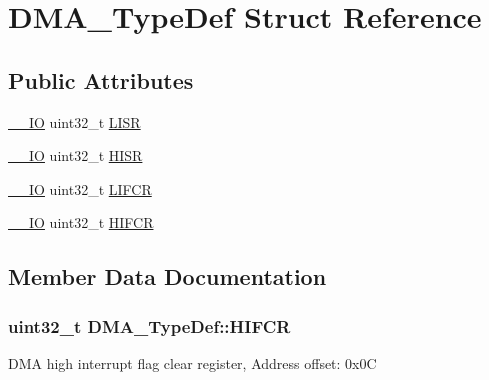 \hypertarget{struct_d_m_a___type_def}{}\section{D\+M\+A\+\_\+\+Type\+Def Struct Reference}
\label{struct_d_m_a___type_def}
\subsection*{Public Attributes}
\begin{DoxyCompactItemize}
\item 
\hyperlink{core__cm4_8h_aec43007d9998a0a0e01faede4133d6be}{\+\_\+\+\_\+\+IO} uint32\+\_\+t \hyperlink{struct_d_m_a___type_def_aacb4a0977d281bc809cb5974e178bc2b}{L\+I\+SR}
\item 
\hyperlink{core__cm4_8h_aec43007d9998a0a0e01faede4133d6be}{\+\_\+\+\_\+\+IO} uint32\+\_\+t \hyperlink{struct_d_m_a___type_def_a01a90a5fcd6459e10b81c0ab737dd2e3}{H\+I\+SR}
\item 
\hyperlink{core__cm4_8h_aec43007d9998a0a0e01faede4133d6be}{\+\_\+\+\_\+\+IO} uint32\+\_\+t \hyperlink{struct_d_m_a___type_def_a11adb689c874d38b49fa44990323b653}{L\+I\+F\+CR}
\item 
\hyperlink{core__cm4_8h_aec43007d9998a0a0e01faede4133d6be}{\+\_\+\+\_\+\+IO} uint32\+\_\+t \hyperlink{struct_d_m_a___type_def_a1e4f50b935bab2520788ae936f2e55c1}{H\+I\+F\+CR}
\end{DoxyCompactItemize}


\subsection{Member Data Documentation}
\subsubsection[{\texorpdfstring{H\+I\+F\+CR}{HIFCR}}]{ uint32\+\_\+t D\+M\+A\+\_\+\+Type\+Def\+::\+H\+I\+F\+CR}\hypertarget{struct_d_m_a___type_def_a1e4f50b935bab2520788ae936f2e55c1}{}\label{struct_d_m_a___type_def_a1e4f50b935bab2520788ae936f2e55c1}
D\+MA high interrupt flag clear register, Address offset\+: 0x0C 
